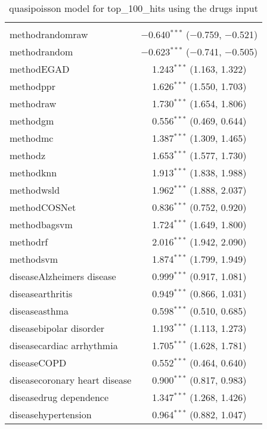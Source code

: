 
\begin{table}[!htbp] \centering 
  \caption{quasipoisson model for top_100_hits using the drugs input} 
  \label{} 
\begin{tabular}{@{\extracolsep{5pt}}lc} 
\\[-1.8ex]\hline 
\hline \\[-1.8ex] 
 methodrandomraw & $-$0.640$^{***}$ ($-$0.759, $-$0.521) \\ 
  methodrandom & $-$0.623$^{***}$ ($-$0.741, $-$0.505) \\ 
  methodEGAD & 1.243$^{***}$ (1.163, 1.322) \\ 
  methodppr & 1.626$^{***}$ (1.550, 1.703) \\ 
  methodraw & 1.730$^{***}$ (1.654, 1.806) \\ 
  methodgm & 0.556$^{***}$ (0.469, 0.644) \\ 
  methodmc & 1.387$^{***}$ (1.309, 1.465) \\ 
  methodz & 1.653$^{***}$ (1.577, 1.730) \\ 
  methodknn & 1.913$^{***}$ (1.838, 1.988) \\ 
  methodwsld & 1.962$^{***}$ (1.888, 2.037) \\ 
  methodCOSNet & 0.836$^{***}$ (0.752, 0.920) \\ 
  methodbagsvm & 1.724$^{***}$ (1.649, 1.800) \\ 
  methodrf & 2.016$^{***}$ (1.942, 2.090) \\ 
  methodsvm & 1.874$^{***}$ (1.799, 1.949) \\ 
  diseaseAlzheimers disease & 0.999$^{***}$ (0.917, 1.081) \\ 
  diseasearthritis & 0.949$^{***}$ (0.866, 1.031) \\ 
  diseaseasthma & 0.598$^{***}$ (0.510, 0.685) \\ 
  diseasebipolar disorder & 1.193$^{***}$ (1.113, 1.273) \\ 
  diseasecardiac arrhythmia & 1.705$^{***}$ (1.628, 1.781) \\ 
  diseaseCOPD & 0.552$^{***}$ (0.464, 0.640) \\ 
  diseasecoronary heart disease & 0.900$^{***}$ (0.817, 0.983) \\ 
  diseasedrug dependence & 1.347$^{***}$ (1.268, 1.426) \\ 
  diseasehypertension & 0.964$^{***}$ (0.882, 1.047) \\ 

\end{tabular}
\end{table}
